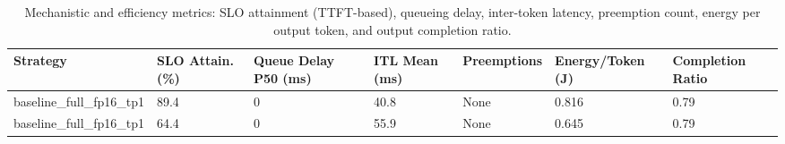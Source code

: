 \begin{table}
\caption{Mechanistic and efficiency metrics: SLO attainment (TTFT-based), queueing delay, inter-token latency, preemption count, energy per output token, and output completion ratio.}
\label{tab:efficiency}
\begin{tabular}{lllllll}
\toprule
Strategy & SLO Attain. (\%) & Queue Delay P50 (ms) & ITL Mean (ms) & Preemptions & Energy/Token (J) & Completion Ratio \\
\midrule
baseline\_full\_fp16\_tp1 & 89.4 & 0 & 40.8 & None & 0.816 & 0.79 \\
baseline\_full\_fp16\_tp1 & 64.4 & 0 & 55.9 & None & 0.645 & 0.79 \\
\bottomrule
\end{tabular}
\end{table}
